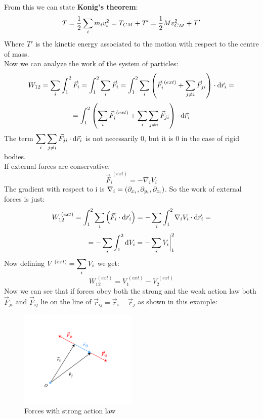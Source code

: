 From this we can state \textbf{Konig's theorem}:
\begin{equation}
    T = \dfrac{1}{2}\displaystyle\sum_i m_i v_i^2 = T_{CM} + T' = \dfrac{1}{2}M v_{CM}^2 + T'
\end{equation}
Where $T'$ is the kinetic energy associated to the motion with respect to the centre of mass.\\
Now we can analyze the work of the system of particles:
\begin{equation}
    W_{12} = \displaystyle\sum_i\int_{1}^{2}\vec{F}_i = \int_{1}^{2}\displaystyle\sum_i\vec{F}_i = \int_{1}^{2}\displaystyle\sum_i\left(\vec{F}_i^{\;(ext)} + \displaystyle\sum_{j\neq i}\vec{F}_{ji}\right)\cdot \mathrm{d}\vec{r}_i =
\end{equation}
\begin{equation}
    = \int_{1}^{2}\left(\displaystyle\sum_i\vec{F}_i^{\;(ext)} + \displaystyle\sum_i\displaystyle\sum_{j\neq i}\vec{F}_{ji}\right)\cdot \mathrm{d}\vec{r}_i
\end{equation}
The term $\displaystyle\sum_i\displaystyle\sum_{j\neq i}\vec{F}_{ji}\cdot \mathrm{d}\vec{r}_i$ is not necessarily 0, but it is 0 in the case of rigid bodies.\\
If external forces are conservative:
\begin{equation}
    \vec{F}_i^{\;(ext)} = -\nabla_i V_i
\end{equation}
The gradient with respect to i is $\nabla_i = \left(\partial_{x_i}, \partial_{y_i}, \partial_{z_i}\right)$. So the work of external forces is just:
\begin{equation}
    W_{12}^{\;(ext)} = \int_{1}^{2}\displaystyle\sum_i\left(\vec{F}_i\cdot\mathrm{d}\vec{r}_i\right) = -\displaystyle\sum_i\int_{1}^{2}\nabla_i V_i\cdot\mathrm{d}\vec{r}_i =
\end{equation}
\begin{equation}
    = -\displaystyle\sum_i\int_{1}^{2}\mathrm{d}V_i = -\displaystyle\sum_i V_i\bigg|_1^2
\end{equation}
Now defining $V^{\;(ext)} = \displaystyle\sum_i V_i$ we get:
\begin{equation}
    W_{12}^{\;(ext)} = V^{\;(ext)}_1 - V^{\;(ext)}_2
\end{equation}
Now we can see that if forces obey both the strong and the weak action law both $\vec{F}_{ji}$ and $\vec{F}_{ij}$ lie on the line of $\vec{r}_{ij} = \vec{r}_i-\vec{r}_j$ as shown in this example:
\begin{figure}[!ht]
    \centering
    \includegraphics[width=0.5\textwidth]{res/svg/forcesstronglaw.drawio}
    \caption{Forces with strong action law}
    \label{fig:image5}
\end{figure}
